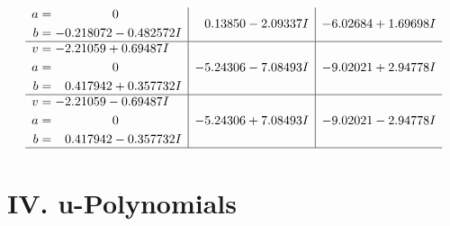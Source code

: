 \documentclass[1p]{elsarticle_modified}
\theoremstyle{definition}
\begin{document}
$$\begin{array}{c|c|c}
\begin{aligned}
a &= \phantom{-0.000000 } 0 \\
b &= -0.218072 - 0.482572 I\end{aligned}
 & \phantom{-}0.13850 - 2.09337 I & -6.02684 + 1.69698 I \\ \hline\begin{aligned}
v &= -2.21059 + 0.69487 I \\
a &= \phantom{-0.000000 } 0 \\
b &= \phantom{-}0.417942 + 0.357732 I\end{aligned}
 & -5.24306 - 7.08493 I & -9.02021 + 2.94778 I \\ \hline\begin{aligned}
v &= -2.21059 - 0.69487 I \\
a &= \phantom{-0.000000 } 0 \\
b &= \phantom{-}0.417942 - 0.357732 I\end{aligned}
 & -5.24306 + 7.08493 I & -9.02021 - 2.94778 I\\
 \hline 
 \end{array}$$\newpage
\newpage\renewcommand{\arraystretch}{1}
\centering \section*{ IV. u-Polynomials}
\end{document}
